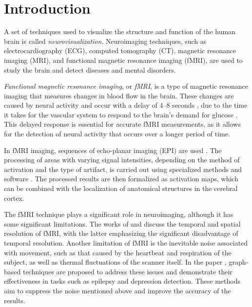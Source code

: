 \documentclass[sn-mathphys-num]{sn-jnl}%
\theoremstyle{thmstyleone}%
\theoremstyle{thmstyletwo}%
\theoremstyle{thmstylethree}%
\begin{document}

\maketitle

\section{Introduction}

A set of techniques used to visualize the structure and function of the human brain is called \textit{neurovisualization}. Neuroimaging \cite{puras2014neurovisualization} techniques, such as electrocardiography (ECG), computed tomography (CT), magnetic resonance imaging (MRI), and functional magnetic resonance imaging (fMRI), are used to study the brain and detect diseases and mental disorders.

\textit{Functional magnetic resonance imaging}, or \textit{fMRI}, is a type of magnetic resonance imaging  that measures changes in blood flow in the brain. These changes are caused by neural activity \cite{Glover2011} and occur with a delay of 4--8 seconds \cite{Bandettini1992}, due to the time it takes for the vascular system to respond to the brain's demand for glucose \cite{Ogawa1990, LEBIHAN1995231, Logothetis2003}. This delayed response is essential for accurate fMRI measurements, as it allows for the detection of neural activity that occurs over a longer period of time.

In fMRI imaging, sequences of echo-planar imaging (EPI) are used \cite{Connelly1993, Kwong1992, Ogawa1992}. The processing of areas with varying signal intensities, depending on the method of activation and the type of artifact, is carried out using specialized methods and software \cite{Bandettini1992, BAUDENDISTEL1995701, COX1996162}. The processed results are then formalized as activation maps, which can be combined with the localization of anatomical structures in the cerebral cortex.

The fMRI technique plays a significant role in neuroimaging, although it has some significant limitations. The works of \cite{menon1999spatial} and \cite{logothetis2008we} discuss the temporal and spatial resolution of fMRI, with the latter emphasizing the significant disadvantage of temporal resolution. Another limitation of fMRI is the inevitable noise associated with movement, such as that caused by the heartbeat and respiration of the subject, as well as thermal fluctuations of the scanner itself. In the paper \cite{1804.10167}, graph-based techniques are proposed to address these issues and demonstrate their effectiveness in tasks such as epilepsy and depression detection. These methods aim to suppress the noise mentioned above and improve the accuracy of the results.
\end{document}
